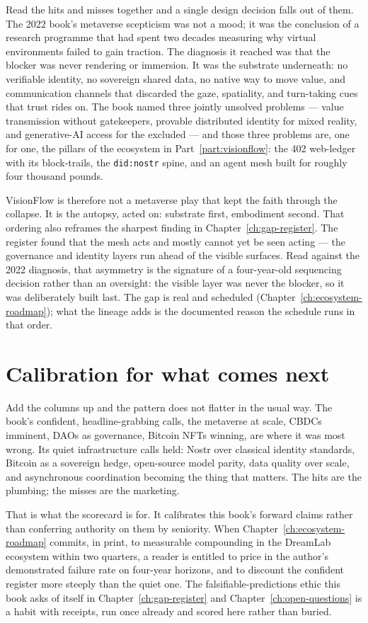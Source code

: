 Read the hits and misses together and a single design decision falls out of them. The 2022 book's metaverse scepticism was not a mood; it was the conclusion of a research programme that had spent two decades measuring why virtual environments failed to gain traction. The diagnosis it reached was that the blocker was never rendering or immersion. It was the substrate underneath: no verifiable identity, no sovereign shared data, no native way to move value, and communication channels that discarded the gaze, spatiality, and turn-taking cues that trust rides on. The book named three jointly unsolved problems --- value transmission without gatekeepers, provable distributed identity for mixed reality, and generative-AI access for the excluded --- and those three problems are, one for one, the pillars of the ecosystem in Part~\ref{part:visionflow}: the 402 web-ledger with its block-trails, the \texttt{did:nostr} spine, and an agent mesh built for roughly four thousand pounds.

VisionFlow is therefore not a metaverse play that kept the faith through the collapse. It is the autopsy, acted on: substrate first, embodiment second. That ordering also reframes the sharpest finding in Chapter~\ref{ch:gap-register}. The register found that the mesh acts and mostly cannot yet be seen acting --- the governance and identity layers run ahead of the visible surfaces. Read against the 2022 diagnosis, that asymmetry is the signature of a four-year-old sequencing decision rather than an oversight: the visible layer was never the blocker, so it was deliberately built last. The gap is real and scheduled (Chapter~\ref{ch:ecosystem-roadmap}); what the lineage adds is the documented reason the schedule runs in that order.

\section{Calibration for what comes next}

Add the columns up and the pattern does not flatter in the usual way. The book's confident, headline-grabbing calls, the metaverse at scale, CBDCs imminent, DAOs as governance, Bitcoin NFTs winning, are where it was most wrong. Its quiet infrastructure calls held: Nostr over classical identity standards, Bitcoin as a sovereign hedge, open-source model parity, data quality over scale, and asynchronous coordination becoming the thing that matters. The hits are the plumbing; the misses are the marketing.

That is what the scorecard is for. It calibrates this book's forward claims rather than conferring authority on them by seniority. When Chapter~\ref{ch:ecosystem-roadmap} commits, in print, to measurable compounding in the DreamLab ecosystem within two quarters, a reader is entitled to price in the author's demonstrated failure rate on four-year horizons, and to discount the confident register more steeply than the quiet one. The falsifiable-predictions ethic this book asks of itself in Chapter~\ref{ch:gap-register} and Chapter~\ref{ch:open-questions} is a habit with receipts, run once already and scored here rather than buried.

